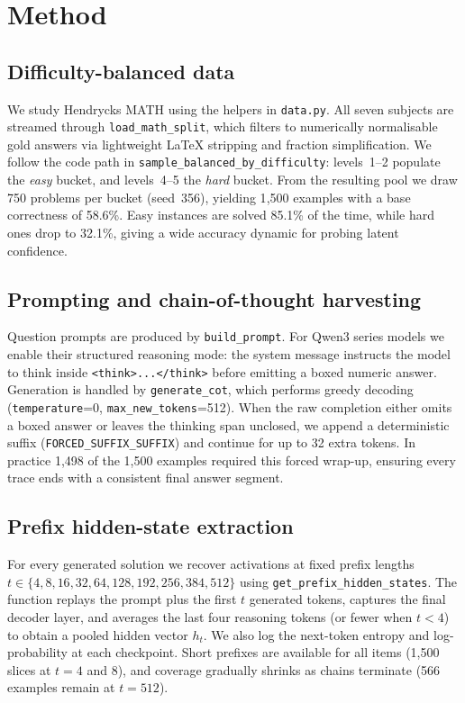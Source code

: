 \documentclass[10pt,a4paper,twocolumn]{article}
\begin{document}
\section{Method}
\label{sec:method}

\subsection{Difficulty-balanced data}
We study Hendrycks MATH \cite{hendrycksmath2021} using the helpers in \texttt{data.py}.  All seven subjects are streamed through \texttt{load\_math\_split}, which filters to numerically normalisable gold answers via lightweight LaTeX stripping and fraction simplification.  We follow the code path in \texttt{sample\_balanced\_by\_difficulty}: levels~1--2 populate the \emph{easy} bucket, and levels~4--5 the \emph{hard} bucket.  From the resulting pool we draw 750 problems per bucket (seed~356), yielding 1{,}500 examples with a base correctness of 58.6\%.  Easy instances are solved 85.1\% of the time, while hard ones drop to 32.1\%, giving a wide accuracy dynamic for probing latent confidence.

\subsection{Prompting and chain-of-thought harvesting}
Question prompts are produced by \texttt{build\_prompt}.  For Qwen3 series models we enable their structured reasoning mode: the system message instructs the model to think inside \verb|<think>...</think>| before emitting a boxed numeric answer.  Generation is handled by \texttt{generate\_cot}, which performs greedy decoding (\texttt{temperature}=0, \texttt{max\_new\_tokens}=512).  When the raw completion either omits a boxed answer or leaves the thinking span unclosed, we append a deterministic suffix (\texttt{FORCED\_SUFFIX\_SUFFIX}) and continue for up to 32 extra tokens.  In practice 1{,}498 of the 1{,}500 examples required this forced wrap-up, ensuring every trace ends with a consistent final answer segment.

\subsection{Prefix hidden-state extraction}
For every generated solution we recover activations at fixed prefix lengths $t \in \{4,8,16,32,64,128,192,256,384,512\}$ using \texttt{get\_prefix\_hidden\_states}.  The function replays the prompt plus the first $t$ generated tokens, captures the final decoder layer, and averages the last four reasoning tokens (or fewer when $t<4$) to obtain a pooled hidden vector $h_t$.  We also log the next-token entropy and log-probability at each checkpoint.  Short prefixes are available for all items (1{,}500 slices at $t{=}4$ and $8$), and coverage gradually shrinks as chains terminate (566 examples remain at $t{=}512$).
\end{document}
